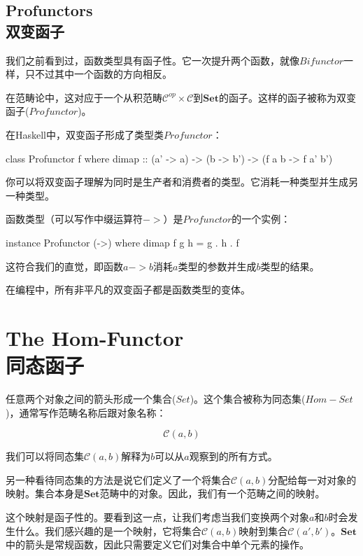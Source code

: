 \documentclass[DaoFP]{subfiles}
\begin{document}
    \subsection{Profunctors\\双变函子}

    我们之前看到过，函数类型具有函子性。它一次提升两个函数，就像$Bifunctor$一样，只不过其中一个函数的方向相反。

    在范畴论中，这对应于一个从积范畴$\mathcal{C}^{op} \times \mathcal{C}$到$\mathbf{Set}$的函子。这样的函子被称为双变函子($Profunctor$)。

    在Haskell中，双变函子形成了类型类$Profunctor$：

    \begin{haskell}
        class Profunctor f where
        dimap :: (a' -> a) -> (b -> b') -> (f a b -> f a' b')
    \end{haskell}

    你可以将双变函子理解为同时是生产者和消费者的类型。它消耗一种类型并生成另一种类型。

    函数类型（可以写作中缀运算符$->$）是$Profunctor$的一个实例：

    \begin{haskell}
        instance Profunctor (->) where
        dimap f g h = g . h . f
    \end{haskell}

    这符合我们的直觉，即函数$a -> b$消耗$a$类型的参数并生成$b$类型的结果。

    在编程中，所有非平凡的双变函子都是函数类型的变体。

    \section{The Hom-Functor\\同态函子}

    任意两个对象之间的箭头形成一个集合($Set$)。这个集合被称为同态集($Hom-Set$)，通常写作范畴名称后跟对象名称：

    $$\mathcal{C}(a, b)$$

    我们可以将同态集$\mathcal{C}(a, b)$解释为$b$可以从$a$观察到的所有方式。

    另一种看待同态集的方法是说它们定义了一个将集合$\mathcal{C}(a, b)$分配给每一对对象的映射。集合本身是$\mathbf{Set}$范畴中的对象。因此，我们有一个范畴之间的映射。

    这个映射是函子性的。要看到这一点，让我们考虑当我们变换两个对象$a$和$b$时会发生什么。我们感兴趣的是一个映射，它将集合$\mathcal{C}(a, b)$映射到集合$\mathcal{C}(a', b')$。$\mathbf{Set}$中的箭头是常规函数，因此只需要定义它们对集合中单个元素的操作。
\end{document}

